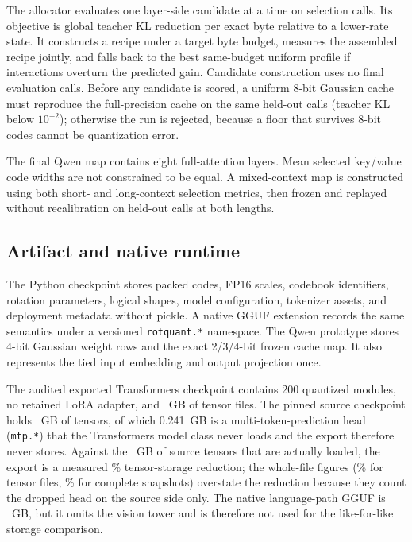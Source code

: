 \documentclass[10pt,twocolumn]{article}
\begin{document}
The allocator evaluates one layer-side candidate at a time on selection calls.
Its objective is global teacher KL reduction per exact byte relative to a
lower-rate state. It constructs a recipe under a target byte budget, measures
the assembled recipe jointly, and falls back to the best same-budget uniform
profile if interactions overturn the predicted gain. Candidate construction
uses no final evaluation calls. Before any candidate is scored, a uniform
8-bit Gaussian cache must reproduce the full-precision cache on the same
held-out calls (teacher KL below $10^{-2}$); otherwise the run is rejected,
because a floor that survives 8-bit codes cannot be quantization error.

The final Qwen map contains eight full-attention layers. Mean selected
key/value code widths are not constrained to be equal. A mixed-context map is
constructed using both short- and long-context selection metrics, then frozen
and replayed without recalibration on held-out calls at both lengths.

\subsection{Artifact and native runtime}

The Python checkpoint stores packed codes, FP16 scales, codebook identifiers,
rotation parameters, logical shapes, model configuration, tokenizer assets,
and deployment metadata without pickle. A native GGUF extension records the
same semantics under a versioned \texttt{rotquant.*} namespace. The Qwen
prototype stores 4-bit Gaussian weight rows and the exact 2/3/4-bit frozen
cache map. It also represents the tied input embedding and output projection
once.

The audited exported Transformers checkpoint contains 200 quantized modules,
no retained LoRA adapter, and \RotQuantTensorGB{}~GB of tensor files. The
pinned source checkpoint holds \SourceTensorGB{}~GB of tensors, of which
0.241~GB is a multi-token-prediction head (\texttt{mtp.*}) that the
Transformers model class never loads and the export therefore never stores.
Against the \SourceTensorExclMtpGB{}~GB of source tensors that are actually
loaded, the export is a measured \LikeForLikeTensorReductionPct\%
tensor-storage reduction; the whole-file figures
(\ActualTensorReductionPct\% for tensor files, \ActualSnapshotReductionPct\%
for complete snapshots) overstate the reduction because they count the dropped
head on the source side only. The native language-path GGUF is
\NativeGGUFGB{}~GB, but it omits the vision tower and is therefore not used for
the like-for-like storage comparison.
\end{document}
